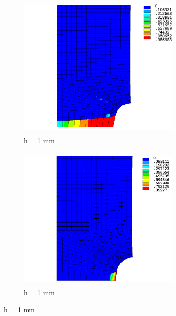 \documentclass[12pt,twoside]{report}
\begin{document}
\begin{figure}[htbp!]
     \begin{subfigure}{0.4\textwidth}
         \includegraphics[width=8cm,height=7.2cm,keepaspectratio]{25.d1-1-r.png}
         \caption{h = 1 mm}
         \label{fig:d1-1-r}
     \end{subfigure}
    \hspace{1.8cm}
     \captionsetup[subfigure]{justification=centering}
     \begin{subfigure}{0.4\textwidth}
         \includegraphics[width=8cm,height=7.2cm,keepaspectratio]{25.d1-1-nr.png}
         \caption{h = 1 mm}
         \label{fig:d1-1-nr}
     \end{subfigure}
\end{figure}
\FloatBarrier
\end{document}
